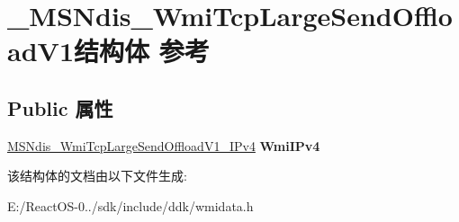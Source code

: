 \hypertarget{struct___m_s_ndis___wmi_tcp_large_send_offload_v1}{}\section{\+\_\+\+M\+S\+Ndis\+\_\+\+Wmi\+Tcp\+Large\+Send\+Offload\+V1结构体 参考}
\label{struct___m_s_ndis___wmi_tcp_large_send_offload_v1}
\subsection*{Public 属性}
\begin{DoxyCompactItemize}
\item 
\mbox{\label{struct___m_s_ndis___wmi_tcp_large_send_offload_v1_a45cc63b5dfcc01459fdf93ca772a1447}} 
\hyperlink{struct___m_s_ndis___wmi_tcp_large_send_offload_v1___i_pv4}{M\+S\+Ndis\+\_\+\+Wmi\+Tcp\+Large\+Send\+Offload\+V1\+\_\+\+I\+Pv4} {\bfseries Wmi\+I\+Pv4}
\end{DoxyCompactItemize}


该结构体的文档由以下文件生成\+:\begin{DoxyCompactItemize}
\item 
E\+:/\+React\+O\+S-\/0../sdk/include/ddk/wmidata.\+h\end{DoxyCompactItemize}
